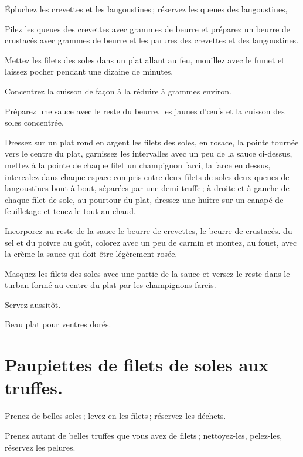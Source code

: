 Épluchez les crevettes et les langoustines ; réservez les queues des
langoustines,

Pilez les queues des crevettes avec {\mmm} grammes de beurre et préparez un beurre
de crustacés avec {\mmm} grammes de beurre et les parures des crevettes et des
langoustines.

Mettez les filets des soles dans un plat allant au feu, mouillez avec le fumet
et laissez pocher pendant une dizaine de minutes.

Concentrez la cuisson de façon à la réduire à {\mmm} grammes environ.

Préparez une sauce avec le reste du beurre, les jaunes d'œufs et la cuisson des
soles concentrée.

Dressez sur un plat rond en argent les filets des soles, en rosace, la pointe
tournée vers le centre du plat, garnissez les intervalles avec un peu de la
sauce ci-dessus, mettez à la pointe de chaque filet un champignon farci, la
farce en dessus, intercalez dans chaque espace compris entre deux filets de
soles deux queues de langoustines bout à bout, séparées par une demi-truffe ;
à droite et à gauche de chaque filet de sole, au pourtour du plat, dressez une
huître sur un canapé de feuilletage et tenez le tout au chaud.

Incorporez au reste de la sauce le beurre de crevettes, le beurre de crustacés.
du sel et du poivre au goût, colorez avec un peu de carmin et montez, au fouet,
avec la crème la sauce qui doit être légèrement rosée.

Masquez les filets des soles avec une partie de la sauce et versez le reste
dans le turban formé au centre du plat par les champignons farcis.

Servez aussitôt.

Beau plat pour ventres dorés.

\section*{\centering Paupiettes de filets de soles aux truffes.}

Prenez de belles soles ; levez-en les filets ; réservez les déchets.

Prenez autant de belles truffes que vous avez de filets ; nettoyez-les,
pelez-les, réservez les pelures.

